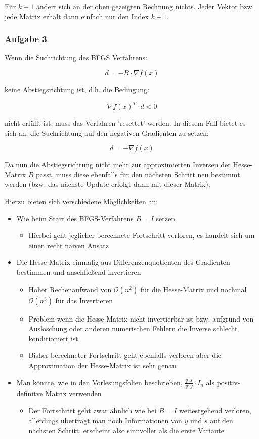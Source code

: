 \documentclass[a4paper, 12pt]{report}
\begin{document}
Für $k + 1$ ändert sich an der oben gezeigten Rechnung nichts. Jeder Vektor bzw. jede Matrix erhält dann einfach nur den Index $k + 1$.

\subsubsection{Aufgabe 3}
Wenn die Suchrichtung des BFGS Verfahrens:

$$d = -B\cdot \nabla f(x) $$

keine Abstiegsrichtung ist, d.h. die Bedingung:

$$\nabla f(x)^T \cdot d < 0 $$

nicht erfüllt ist, muss das Verfahren 'resettet' werden. In diesem Fall bietet es sich an, die Suchrichtung auf den
negativen Gradienten zu setzen:

$$d = -\nabla f(x)$$

Da nun die Abstiegsrichtung nicht mehr zur approximierten Inversen der Hesse-Matrix $B$ passt, muss diese ebenfalls für
den nächsten Schritt neu bestimmt werden (bzw. das nächste Update erfolgt dann mit dieser Matrix).\par
Hierzu bieten sich verschiedene Möglichkeiten an:

\begin{itemize}
  \item Wie beim Start des BFGS-Verfahrens $B = I$ setzen
  \begin{itemize}
    \item Hierbei geht jeglicher berechnete Fortschritt verloren, es handelt sich um einen recht naiven Ansatz
  \end{itemize}
  \item Die Hesse-Matrix einmalig aus Differenzenquotienten des Gradienten bestimmen und anschließend invertieren
  \begin{itemize}
    \item Hoher Rechenaufwand von $\mathcal{O}(n^2)$ für die Hesse-Matrix und nochmal $\mathcal{O}(n^3)$ für das Invertieren
    \item Problem wenn die Hesse-Matrix nicht invertierbar ist bzw. aufgrund von Auslöschung oder anderen numerischen Fehlern
    die Inverse schlecht konditioniert ist
    \item Bisher berechneter Fortschritt geht ebenfalls verloren aber die Approximation der Hesse-Matrix ist sehr genau
  \end{itemize}
  \item Man könnte, wie in den Vorlesungsfolien beschrieben,  $\frac{y^Ts}{y^Ty}\cdot I_n$ als positiv-definitve Matrix verwenden
  \begin{itemize}
    \item Der Fortschritt geht zwar ähnlich wie bei $B = I$ weitestgehend verloren, allerdings überträgt man noch Informationen
    von $y$ und $s$ auf den nächsten Schritt, erscheint also sinnvoller als die erste Variante
  \end{itemize}
\end{itemize}
\end{document}
